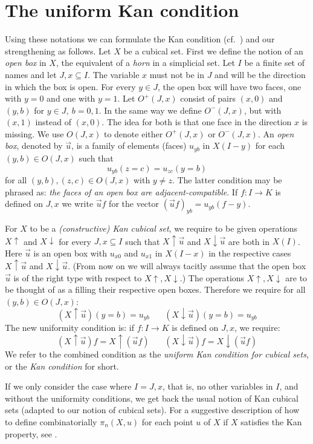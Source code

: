 \documentclass[10pt,a4paper]{article}
\newcommand{\rup}[1]{#1{\uparrow}}
\newcommand{\rdo}[1]{#1{\downarrow}}
\begin{document}
\section{The uniform Kan condition}

Using these notations we can formulate the Kan condition (cf.\
\cite{Kan}) and our strengthening as follows. Let $X$ be a cubical
set.  First we define the notion of an \emph{open box} in $X$, the
equivalent of a \emph{horn} in a simplicial set.  Let $I$ be a finite
set of names and let $J,x \subseteq I$.  The variable $x$ must not be
in $J$ and will be the direction in which the box is open.  For every
$y\in J$, the open box will have two faces, one with $y=0$ and one
with $y=1$.  Let $O^+(J,x)$ consist of pairs $(x,0)$ and $(y,b)$ for
$y\in J,~b=0,1$.  In the same way we define $O^-(J,x)$, but with
$(x,1)$ instead of $(x,0)$.  The idea for both is that one face in the
direction $x$ is missing.  We use $O(J,x)$ to denote either $O^+(J,x)$
or $O^-(J,x)$.  An \emph{open box}, denoted by $\vec u$, is a family
of elements (faces) $u_{yb}$ in $X(I-y)$ for each $(y,b)\in O(J,x)$
such that
$$u_{yb}(z = c) = u_{zc}(y = b)$$
for all $(y,b),(z,c)\in O(J,x)$ with $y\neq z$.  The latter condition
may be phrased as: \emph{the faces of an open box are
  adjacent-compatible}.  If $f:I\to K$ is defined on $J,x$ we write
$\vec u f$ for the vector $(\vec u f)_{yb} = u_{yb} (f-y)$.

For $X$ to be a \emph{(constructive) Kan cubical set}, we require to
be given operations $\rup{X}$ and $\rdo{X}$ for every $J,x\subseteq I$
such that $\rup{X} \vec u$ and $\rdo{X} \vec u$ are both in $X(I)$.
Here $\vec u$ is an open box with $u_{x0}$ and $u_{x1}$ in $X(I-x)$ in
the respective cases $\rup{X} \vec u$ and $\rdo{X} \vec u$. (From now
on we will always tacitly assume that the open box $\vec u$ is of the
right type with respect to $\rup{X},\rdo{X}$.)  The operations
$\rup{X},\rdo{X}$ are to be thought of as a filling their respective
open boxes. Therefore we require for all $(y,b)\in O(J,x)$:
$$
(\rup{X} \vec u) (y=b) = u_{yb}~~~~~~~~(\rdo{X} \vec u) (y=b) = u_{yb}
$$
The new uniformity condition is: if $f:I\to K$ is defined on $J,x$, we
require:
$$
(\rup{X} \vec u) f = \rup{X} (\vec{u}f)~~~~~~~~(\rdo{X} \vec u) f = \rdo{X} (\vec{u}f)
$$
We refer to the combined condition as the \emph{uniform Kan condition
  for cubical sets}, or the \emph{Kan condition} for
short. %

If we only consider the case where $I = J,x$, that is, no other
variables in $I$, and without the uniformity conditions, we get back
the usual notion of Kan cubical sets \cite[Section 4]{Kan} (adapted to
our notion of cubical sets).  For a suggestive description of how to
define combinatorially $\pi_n(X,u)$ for each point $u$ of $X$ if $X$
satisfies the Kan property, see \cite{Williamson}.
\end{document}
